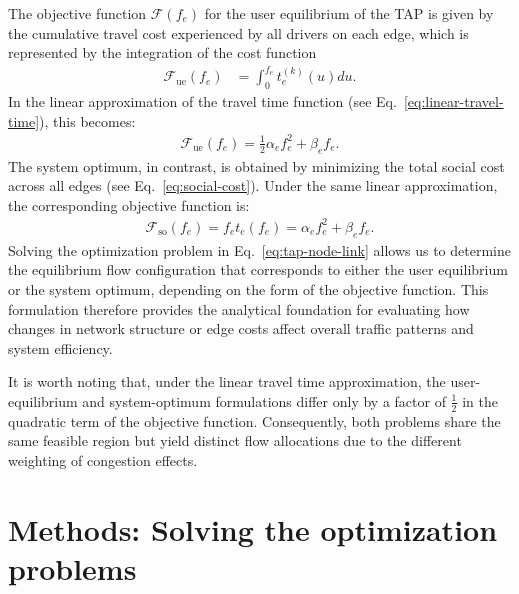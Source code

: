 \documentclass[twocolumn,english,groupedaddress, superscriptaddress,aps,pre,10pt,floatfix]{revtex4-2}
\begin{document}
The objective function $\mathcal{F}(f_e)$ for the user equilibrium of the TAP is given by the cumulative travel cost experienced by all drivers on each edge, which is represented by the integration of the cost function~\cite{beckmann1956studies}
\begin{align}
    \mathcal{F}_{\text{ue}}(f_e) &= \int_0^{f_{e}} t_{e}^{(k)}(u)du.
\end{align}
In the linear approximation of the travel time function (see Eq.~\eqref{eq:linear-travel-time}), this becomes:
\begin{align}
\mathcal{F}_{\text{ue}}(f_e) = \frac{1}{2} \alpha_e f_e^2 + \beta_e f_e.
\end{align}
The system optimum, in contrast, is obtained by minimizing the total social cost across all edges (see Eq.~\ref{eq:social-cost}). Under the same linear approximation, the corresponding objective function is:
\begin{align}
\mathcal{F}_{\text{so}}(f_e) = f_e t_e(f_e) = \alpha_e f_e^2 + \beta_e f_e.
\end{align}
Solving the optimization problem in Eq.~\eqref{eq:tap-node-link} allows us to determine the equilibrium flow configuration that corresponds to either the user equilibrium or the system optimum, depending on the form of the objective function. This formulation therefore provides the analytical foundation for evaluating how changes in network structure or edge costs affect overall traffic patterns and system efficiency.

It is worth noting that, under the linear travel time approximation, the user-equilibrium and system-optimum formulations differ only by a factor of $\frac{1}{2}$ in the quadratic term of the objective function. Consequently, both problems share the same feasible region but yield distinct flow allocations due to the different weighting of congestion effects.


\section{Methods: Solving the optimization problems}\label{sec:methods-solve}
\end{document}
